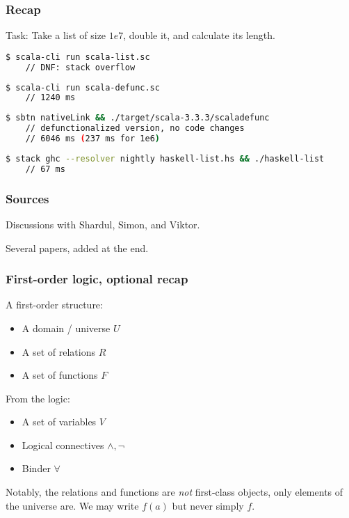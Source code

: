 \documentclass[aspectratio=1610, xcolor={dvipsnames}]{beamer}
\begin{document}
\begin{frame}[fragile]
    \frametitle{Recap}

    Task: Take a list of size $1e7$, double it, and calculate its length.

    \begin{lstlisting}[language=bash]
    $ scala-cli run scala-list.sc
    // DNF: stack overflow
    \end{lstlisting}

    \begin{lstlisting}[language=bash]
    $ scala-cli run scala-defunc.sc
    // 1240 ms 
    \end{lstlisting}

    \begin{lstlisting}[language=bash]
    $ sbtn nativeLink && ./target/scala-3.3.3/scaladefunc
    // defunctionalized version, no code changes
    // 6046 ms (237 ms for 1e6)
    \end{lstlisting}

    \begin{lstlisting}[language=bash]
    $ stack ghc --resolver nightly haskell-list.hs && ./haskell-list
    // 67 ms
    \end{lstlisting}

\end{frame}

\begin{frame}
    \frametitle{Sources}

    Discussions with Shardul, Simon, and Viktor.

    Several papers, added at the end.

\end{frame}

\begin{frame}
    \frametitle{First-order logic, optional recap}

    A first-order structure:

    \begin{itemize}
        \item A domain / universe \(U\)
        \item A set of relations \(R\)
        \item A set of functions \(F\)
    \end{itemize}

    From the logic:
    \begin{itemize}
        \item A set of variables \(V\)
        \item Logical connectives \(\land, \neg\)
        \item Binder \(\forall\)
    \end{itemize}

    Notably, the relations and functions are \emph{not} first-class objects,
    only elements of the universe are. We may write \(f(a)\) but never simply
    \(f\).

\end{frame}
\end{document}
